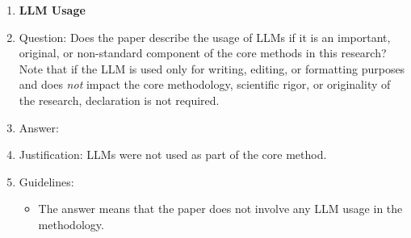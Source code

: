 \begin{enumerate}
\item {\bf LLM Usage}
    \item[] Question: Does the paper describe the usage of LLMs if it is an important, original, or non-standard component of the core methods in this research? Note that if the LLM is used only for writing, editing, or formatting purposes and does \emph{not} impact the core methodology, scientific rigor, or originality of the research, declaration is not required.
    \item[] Answer: \answerNA{}
    \item[] Justification: LLMs were not used as part of the core method.
    \item[] Guidelines:
    \begin{itemize}
        \item The answer \answerNA{} means that the paper does not involve any LLM usage in the methodology.
    \end{itemize}

\end{enumerate}
